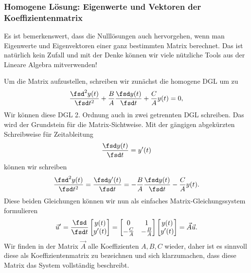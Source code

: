 \subsubsection{Homogene Lösung: Eigenwerte und Vektoren der Koeffizientenmatrix}
%
Es ist bemerkenswert, dass die Nulllösungen
auch hervorgehen, wenn man Eigenwerte und Eigenvektoren einer ganz bestimmten Matrix
berechnet. Das ist natürlich kein Zufall und mit der Denke können wir viele
nützliche Tools aus der Lineare Algebra mitverwenden!

Um die Matrix aufzustellen, schreiben wir zunächst die homogene DGL um zu
\begin{align}
\frac{\fsd^2 y(t)}{\fsd t^2} + \frac{B}{A} \frac{\fsd y(t)}{\fsd t} + \frac{C}{A} y(t) = 0,
\end{align}
%
Wir können diese DGL 2. Ordnung auch in zwei getrennten DGL schreiben. Das wird
der Grundstein für die Matrix-Sichtweise.
%
Mit der gängigen abgekürzten Schreibweise für Zeitableitung
\begin{align}
\frac{\fsd y(t)}{\fsd t} = y'(t)
\end{align}
können wir schreiben
\begin{align}
\frac{\fsd^2 y(t)}{\fsd t^2} = \frac{\fsd y'(t)}{\fsd t} = - \frac{B}{A}  \frac{\fsd y(t)}{\fsd t} - \frac{C}{A}  y(t).
\end{align}
%
Diese beiden Gleichungen können wir nun als einfaches Matrix-Gleichungssystem formulieren
\begin{align}
\label{eq:A7BEE9E24E_uAU}
\vec{u}' = \frac{\fsd}{\fsd t}
\begin{bmatrix}
y(t) \\ y'(t)
\end{bmatrix}
=
\begin{bmatrix}
0 & 1 \\ - \frac{C}{A} & - \frac{B}{A}
\end{bmatrix}
\begin{bmatrix}
y(t) \\ y'(t)
\end{bmatrix}
=
\vec{A} \vec{u}.
\end{align}
%
Wir finden in der Matrix $\vec{A}$ alle Koeffizienten $A,B,C$ wieder, daher
ist es sinnvoll diese als Koeffizientenmatrix zu bezeichnen und sich klarzumachen,
dass diese Matrix das System vollständig beschreibt.

